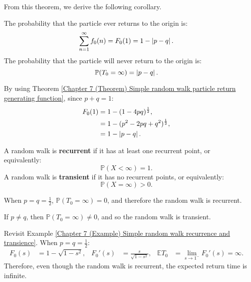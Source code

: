 \documentclass{huhtakm-template-book-v2}
\newcommand{\prob}{\mathbb{P}}
\newcommand{\expect}{\mathbb{E}}
\begin{document}
    From this theorem, we derive the following corollary.
    \begin{cor}
        The probability that the particle ever returns to the origin is:
        \begin{equation*}
            \sum_{n = 1}^{\infty}f_{0}(n) = F_{0}(1) = 1-\left|{p-q}\right|.
        \end{equation*}
        The probability that the particle will never return to the origin is:
        \begin{equation*}
            \prob(T_{0} = \infty) = \abs{p-q}.
        \end{equation*}
    \end{cor}
    \begin{proofing}
        By using Theorem \ref{Chapter 7 (Theorem) Simple random walk particle return generating function}, since $p+q = 1$:
        \begin{align*}
            F_{0}(1) &= 1-(1-4pq)^{\frac{1}{2}},\\
            &= 1-(p^{2}-2pq+q^{2})^{\frac{1}{2}},\\
            &= 1-\left|{p-q}\right|.
        \end{align*}
    \end{proofing}
    \begin{defn}
        A random walk is \textbf{recurrent} if it has at least one recurrent point, or equivalently:
        \begin{equation*}
            \prob(X < \infty) = 1.
        \end{equation*}
        A random walk is \textbf{transient} if it has no recurrent points, or equivalently:
        \begin{equation*}
            \prob(X = \infty) > 0.
        \end{equation*}
    \end{defn}
    \begin{rem}
        When $p = q = \frac{1}{2}$, $\prob(T_{0} = \infty) = 0$, and therefore the random walk is recurrent.
    \end{rem}
    \begin{rem}
        If $p \neq q$, then $\prob(T_{0} = \infty) \neq 0$, and so the random walk is transient.
    \end{rem}
    \begin{eg}
        Revisit Example \ref{Chapter 7 (Example) Simple random walk recurrence and transience}. When $p = q = \frac{1}{2}$:
        \begin{align*}
            F_{0}(s) &= 1-\sqrt{1-s^{2}}, & F_{0}'(s) &= \frac{s}{\sqrt{1-s^{2}}}, & \expect{T_{0}} &= \lim_{s \to 1^{-}}F_{0}'(s) = \infty.
        \end{align*}
        Therefore, even though the random walk is recurrent, the expected return time is infinite.
    \end{eg}
    \newpage
\end{document}
